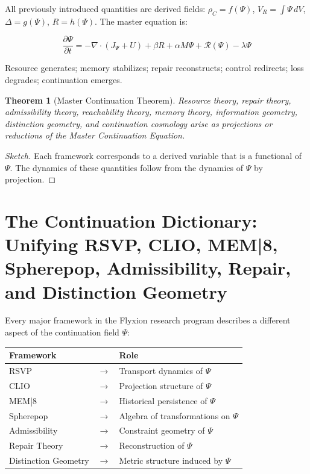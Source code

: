 \documentclass[12pt,a4paper]{article}
\newtheorem{theorem}{Theorem}[section]
\begin{document}
All previously introduced quantities are derived fields: $\rho_C = f(\Psi)$, $V_R = \int\Psi\, dV$, $\Delta = g(\Psi)$, $R = h(\Psi)$. The master equation is:

\[
\boxed{
\frac{\partial\Psi}{\partial t} = -\nabla\cdot(J_\Psi + U) + \beta R + \alpha M\Psi + \mathcal{R}(\Psi) - \lambda\Psi
}
\]

Resource generates; memory stabilizes; repair reconstructs; control redirects; loss degrades; continuation emerges.

\begin{theorem}[Master Continuation Theorem]
Resource theory, repair theory, admissibility theory, reachability theory, memory theory, information geometry, distinction geometry, and continuation cosmology arise as projections or reductions of the Master Continuation Equation.
\end{theorem}

\begin{proof}[Sketch]
Each framework corresponds to a derived variable that is a functional of $\Psi$. The dynamics of these quantities follow from the dynamics of $\Psi$ by projection.
\end{proof}

\section{The Continuation Dictionary: Unifying RSVP, CLIO, MEM|8, Spherepop, Admissibility, Repair, and Distinction Geometry}

Every major framework in the Flyxion research program describes a different aspect of the continuation field $\Psi$:

\medskip
\begin{center}
\begin{tabular}{lcl}
\toprule
Framework & & Role \\
\midrule
RSVP & $\longrightarrow$ & Transport dynamics of $\Psi$ \\
CLIO & $\longrightarrow$ & Projection structure of $\Psi$ \\
MEM|8 & $\longrightarrow$ & Historical persistence of $\Psi$ \\
Spherepop & $\longrightarrow$ & Algebra of transformations on $\Psi$ \\
Admissibility & $\longrightarrow$ & Constraint geometry of $\Psi$ \\
Repair Theory & $\longrightarrow$ & Reconstruction of $\Psi$ \\
Distinction Geometry & $\longrightarrow$ & Metric structure induced by $\Psi$ \\
\bottomrule
\end{tabular}
\end{center}
\end{document}
